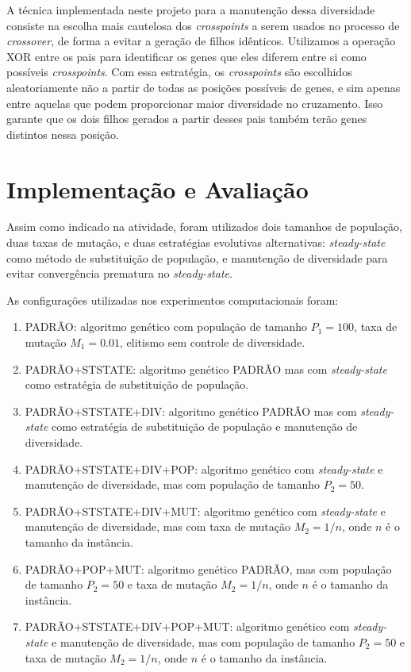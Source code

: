 \documentclass{MO824}
\begin{document}
A técnica implementada neste projeto para a manutenção dessa diversidade consiste na escolha mais cautelosa dos \textit{crosspoints} a serem usados no processo de \textit{crossover}, de forma a evitar a geração de filhos idênticos. Utilizamos a operação XOR entre os pais para identificar os genes que eles diferem entre si como possíveis \textit{crosspoints}. Com essa estratégia, os \textit{crosspoints} são escolhidos aleatoriamente não a partir de todas as posições possíveis de genes, e sim apenas entre aquelas que podem proporcionar maior diversidade no cruzamento. Isso garante que os dois filhos gerados a partir desses pais também terão genes distintos nessa posição. 

\section{Implementação e Avaliação} \label{imp}
    Assim como indicado na atividade, foram utilizados dois tamanhos de população, duas taxas de mutação, e duas estratégias evolutivas alternativas: \textit{steady-state} como método de substituição de população, e manutenção de diversidade para evitar convergência prematura no \textit{steady-state}.
    
    As configurações utilizadas nos experimentos computacionais foram:  
    
\begin{enumerate}
    \item PADRÃO: algoritmo genético com população de tamanho $P_1=100$, taxa de mutação $M_1=0.01$, elitismo sem controle de diversidade.
    
    \item PADRÃO+STSTATE: algoritmo genético PADRÃO mas com \textit{steady-state} como estratégia de substituição de população.
    
    \item PADRÃO+STSTATE+DIV: algoritmo genético PADRÃO mas com \textit{steady-state} como estratégia de substituição de população e manutenção de diversidade.
    
    \item PADRÃO+STSTATE+DIV+POP: algoritmo genético com \textit{steady-state} e manutenção de diversidade, mas com população de tamanho $P_2=50$.
    
    \item PADRÃO+STSTATE+DIV+MUT: algoritmo genético com \textit{steady-state} e manutenção de diversidade, mas com taxa de mutação $M_2=1/n$, onde $n$ é o tamanho da instância.
    
    \item PADRÃO+POP+MUT: algoritmo genético PADRÃO, mas com população de tamanho $P_2=50$ e taxa de mutação $M_2=1/n$, onde $n$ é o tamanho da instância.
    
    \item PADRÃO+STSTATE+DIV+POP+MUT: algoritmo genético com \textit{steady-state} e manutenção de diversidade, mas com população de tamanho $P_2=50$ e taxa de mutação $M_2=1/n$, onde $n$ é o tamanho da instância.
    
\end{enumerate}
\end{document}
